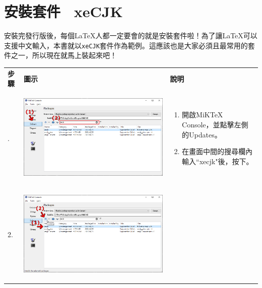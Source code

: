\documentclass{../indiv}
\begin{document}
	\section{安裝套件 \textemdash\ xeCJK}
	安裝完發行版後，每個\LaTeX 人都一定要會的就是安裝套件啦！為了讓\LaTeX 可以支援中文輸入，本書就以\texttt{xeCJK}套件作為範例。這應該也是大家必須且最常用的套件之一，所以現在就馬上裝起來吧！
	\begin{table}[H]
		\centering
		\OSfamily
		\setlength{\tabcolsep}{10pt}
		\begin{tabular}{Z}
			\Thline
			 \textrm{\textbf{\large 步驟}} & \textbf{\large 圖示} & \textbf{\large 說明}\\. &
			\begin{tabmp}[-0.2]
				\centering
				\includegraphics[width=\linewidth]{xecjk-install-1.png}
			\end{tabmp} &
			\begin{tabmp}
				\begin{enumerate}[label=\texttt{(\arabic*)}, nosep, left=0pt, labelsep=0.5ex]
					\item 開啟MiKTeX Console，並點擊左側的Updates。
					\item 在畫面中間的搜尋欄內輸入``xecjk"後，按下\Enter。
				\end{enumerate}
			\end{tabmp}\\
			2. &
			\begin{tabmp}[-0.2]
				\centering
				\includegraphics[width=\linewidth]{xecjk-install-2.png}

\end{tabmp}
\end{tabular}
\end{table}
\end{document}
